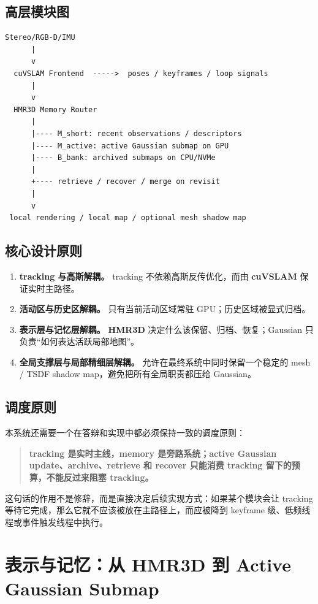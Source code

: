 \documentclass[12pt]{article}
\newcommand{\hmr}{\textbf{HMR3D}}
\newcommand{\cuvslam}{\textbf{cuVSLAM}}
\begin{document}
\subsection{高层模块图}

\begin{verbatim}
Stereo/RGB-D/IMU
      |
      v
  cuVSLAM Frontend  ----->  poses / keyframes / loop signals
      |
      v
  HMR3D Memory Router
      |
      |---- M_short: recent observations / descriptors
      |---- M_active: active Gaussian submap on GPU
      |---- B_bank: archived submaps on CPU/NVMe
      |
      +---- retrieve / recover / merge on revisit
      |
      v
 local rendering / local map / optional mesh shadow map
\end{verbatim}

\subsection{核心设计原则}

\begin{enumerate}
  \item \textbf{tracking 与高斯解耦。} tracking 不依赖高斯反传优化，而由 \cuvslam{} 保证实时主路径。
  \item \textbf{活动区与历史区解耦。} 只有当前活动区域常驻 GPU；历史区域被显式归档。
  \item \textbf{表示层与记忆层解耦。} \hmr{} 决定什么该保留、归档、恢复；Gaussian 只负责“如何表达活跃局部地图”。
  \item \textbf{全局支撑层与局部精细层解耦。} 允许在最终系统中同时保留一个稳定的 mesh / TSDF shadow map，避免把所有全局职责都压给 Gaussian。
\end{enumerate}

\subsection{调度原则}

本系统还需要一个在答辩和实现中都必须保持一致的调度原则：
\begin{quote}
\textbf{tracking 是实时主线，memory 是旁路系统；active Gaussian update、archive、retrieve 和 recover 只能消费 tracking 留下的预算，不能反过来阻塞 tracking。}
\end{quote}

这句话的作用不是修辞，而是直接决定后续实现方式：如果某个模块会让 tracking 等待它完成，那么它就不应该被放在主路径上，而应被降到 keyframe 级、低频线程或事件触发线程中执行。

\section{表示与记忆：从 \hmr{} 到 Active Gaussian Submap}
\end{document}
